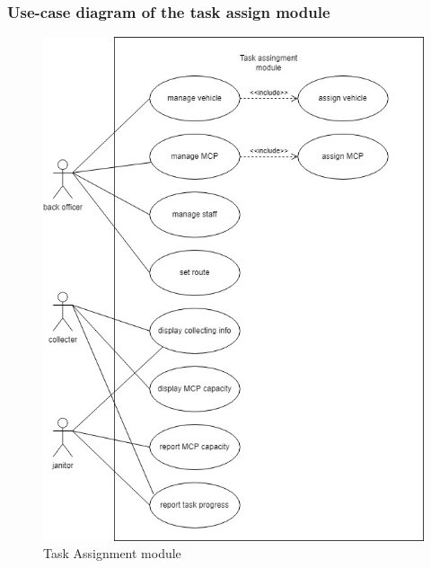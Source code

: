 \documentclass[a4paper, 13pt]{article}
\begin{document}
\subsubsection*{Use-case diagram of the task assign module}

\begin{figure}[H]
    \centering
    \includegraphics[scale=0.6]{requirement/assignModule.jpg}
    \caption{Task Assignment module}
    \label{fig:my_label}
\end{figure}
\newpage
\end{document}
